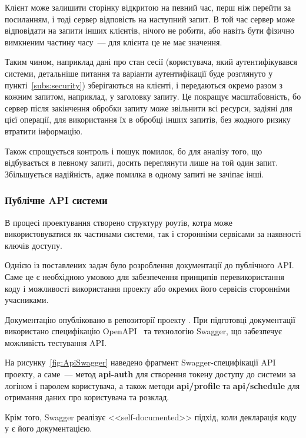 Клієнт може залишити сторінку відкритою на певний час, перш ніж перейти за посиланням, і тоді сервер відповість на наступний запит. В той час сервер може відповідати на запити інших клієнтів, нічого не робити, або навіть бути фізично вимкненим частину часу~--- для клієнта це не має значення.

Таким чином, наприклад дані про стан сесії (користувача, який аутентифікувався системи, детальніше питання та варіанти аутентифікації буде розглянуто у пункті~\ref{subs:security}) зберігаються на клієнті, і передаються окремо разом з кожним запитом, наприклад, у заголовку запиту. Це покращує масштабовність, бо сервер після закінчення обробки запиту може звільнити всі ресурси, задіяні для цієї операції, для використання їх в обробці інших запитів, без жодного ризику втратити інформацію. 

Також спрощується контроль і пошук помилок, бо для аналізу того, що відбувається в певному запиті, досить переглянути лише на той один запит. Збільшується надійність, адже помилка в одному запиті не зачіпає інші.

\subsubsection{Публічне API системи}
В процесі проектування створено структуру роутів, котра може використовуватися як частинами системи, так і сторонніми сервісами за наявності ключів доступу.  

Однією із поставлених задач було розроблення документації до публічного API. Саме це є необхідною умовою для забезпечення принципів перевикористання коду і можливості використання проекту або окремих його сервісів сторонніми учасниками. 

Документацію опубліковано в репозиторії проекту \cite{gitlabKSU}. При підготовці документації використано специфікацію OpenAPI~\cite{ed2018openapitouml} та технологію Swagger, що забезпечує можливість тестування API. 

На рисунку~\ref{fig:ApiSwagger} наведено фрагмент Swagger-специфікації API проекту, а саме~--- метод \textbf{api-auth} для створення токену доступу до системи за логіном і паролем користувача, а також методи \textbf{api/profile} та \textbf{api/schedule}  для отримання даних про користувача та розклад. 


Крім того, Swagger реалізує <<self-documented>> підхід, коли декларація коду у є його документацією. 


